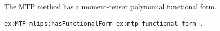 The MTP method has a moment-tensor polynomial functional form.
\begin{lstlisting}[language=turtle]
ex:MTP mlips:hasFunctionalForm ex:mtp-functional-form .
\end{lstlisting}
